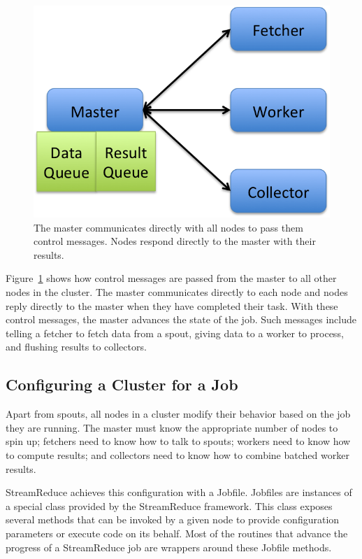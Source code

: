 \documentclass[12pt,twocolumn]{article}
\begin{document}
\begin{figure}
\includegraphics[width=\linewidth]{master-control-queue.png}
\caption{The master communicates directly with all nodes to pass them control messages.
Nodes respond directly to the master with their results.}
\label{fig:mastercontrolqueue}
\end{figure}

Figure~\ref{fig:mastercontrolqueue} shows how control messages are passed from the
master
to all other nodes in the cluster. The master communicates directly to each node and nodes
reply directly to the master when they have completed their task. With these control
messages,
the master advances the state of the job. Such messages include telling a fetcher to fetch
data
from a spout, giving data to a worker to process, and flushing results to collectors.


\subsection{Configuring a Cluster for a Job}
\label{sec:jobfile}
Apart from spouts, all nodes in a cluster modify their behavior based on the job they are
running. The master must know the appropriate number of nodes to spin up; fetchers need
to
know how to talk to spouts; workers need to know how to compute results; and collectors
need
to know how to combine batched worker results.

StreamReduce achieves this configuration with a Jobfile. Jobfiles are instances of a special
class
provided by the StreamReduce framework. This class exposes several methods that can be
invoked by a
given node to provide configuration parameters or execute code on its behalf. Most of the
routines that advance the progress of a StreamReduce job are wrappers around these Jobfile
methods.
\end{document}
